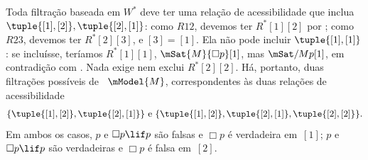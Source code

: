 \documentclass[../../../include/open-logic-section]{subfiles}
\begin{document}
\begin{ex}
  Toda filtração baseada em $W^*$ deve ter uma relação de acessibilidade
  que inclua $\tuple{[1], [2]}, \tuple{[2],[1]}$: como $R12$, devemos ter
  $R^*[1][2]$ por 
  ; como $R23$, devemos ter $R^*[2][3]$,
  e $[3]=[1]$. Ela não pode incluir $\tuple{[1],[1]}$: se incluísse,
  teríamos $R^*[1][1]$, $\mSat{M}{\Box p}[1]$, mas $\mSat/{M}{p}[1]$,
  em contradição com . Nada exige nem
  exclui $R^*[2][2]$. Há, portanto, duas filtrações possíveis de
  ~$\mModel{M}$, correspondentes às duas relações de acessibilidade
  \[
  \{\tuple{[1],[2]}, \tuple{[2],[1]}\} \text{ e }
  \{\tuple{[1],[2]}, \tuple{[2],[1]}, \tuple{[2],[2]}\}.
  \]
  Em ambos os casos, $p$ e $\Box p \lif p$ são falsas e $\Box p$ é
  verdadeira em~$[1]$; $p$ e $\Box p \lif p$ são verdadeiras e
  $\Box p$ é falsa em~$[2]$.
\end{ex}
\end{document}
